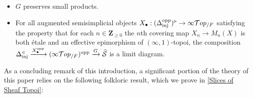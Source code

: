 \documentclass[10pt]{article}
\newcommand{\mS}{\mathcal S}
\newcommand{\cT}{\mathcal{T}}
\newcommand{\ZZ}{\mathbb{Z}}
\def\ZZ{{\mathbf Z}}
\theoremstyle{witharg}
\theoremstyle{witharg}
\theoremstyle{witharg2}
\begin{document}
\begin{proposition}{}
    \begin{itemize}
        \item [$(\textnormal{i})$] $G$ preserves small products. 

        \item [$(\textnormal{ii})$] For all augmented semisimplicial objects $X_\bullet:(\Delta_{\textnormal{inj}}^{\textnormal{opp}})^\triangleright\rightarrow \infty\cT op_{/F}$ satisfying the property that for each $n\in \ZZ_{\geq 0}$ the $n$th covering map $X_n\rightarrow M_n(X)$ is both \'{e}tale and an effective epimorphism of $(\infty,1)$-topoi, the composition $\Delta_{\textnormal{inj}}^\triangleleft\xrightarrow{X^{\textnormal{opp}}_\bullet} (\infty\cT op_{/F})^{\textnormal{opp}}\xrightarrow{G} \widehat{\mS}$ is a limit diagram. 

        
    \end{itemize}
    
\end{proposition}


As a concluding remark of this introduction, a significant portion of the theory of this paper relies on the following folkloric result, which we prove in \ref{Slices of Sheaf Topoi}:
\end{document}
